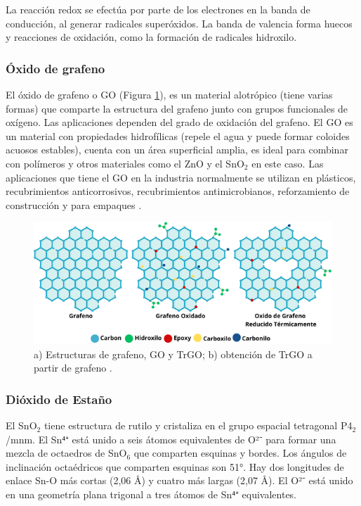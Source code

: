 \documentclass[12pt]{article}
\begin{document}
    La reacción redox se efectúa por parte de los electrones en la banda de conducción, al generar radicales superóxidos. La banda de valencia forma huecos y reacciones de oxidación, como la formación de radicales hidroxilo.\vspace{1em} %
    
    \subsubsection{Óxido de grafeno}
    El óxido de grafeno o GO (Figura \ref{fig:Grafeno_dibujo}), es un material alotrópico (tiene varias formas) que comparte la estructura del grafeno junto con grupos funcionales de oxígeno. Las aplicaciones dependen del grado de oxidación del grafeno. El GO es un material con propiedades hidrofílicas (repele el agua y puede formar coloides acuosos estables), cuenta con un área superficial amplia, es ideal para combinar con polímeros y otros materiales como el ZnO y el SnO$\displaystyle_{2}$ en este caso. Las aplicaciones que tiene el GO en la industria normalmente se utilizan en plásticos, recubrimientos anticorrosivos, recubrimientos antimicrobianos, reforzamiento de construcción y para empaques \cite{IEEEreferencias:Ref12,IEEEreferencias:GO_1}.

    \begin{figure}[H]
    	   \begin{center}
     	  	\includegraphics[width = 1\textwidth]{Imagenes/Grafeno_dibujo.png}
     	  	\caption{a) Estructuras de grafeno, GO y TrGO; b) obtención de TrGO a partir
de grafeno \cite{IEEEreferencias:GO_GOr}. }\label{fig:Grafeno_dibujo}  
    	   \end{center} 
        \end{figure}

        
    \subsubsection{Dióxido de Estaño}
    El SnO$\displaystyle _{2}$ tiene estructura de rutilo y cristaliza en el grupo espacial tetragonal P4$\displaystyle _{2}$/mnm. El Sn⁴⁺ está unido a seis átomos equivalentes de O²⁻ para formar una mezcla de octaedros de SnO$\displaystyle _{6}$ que comparten esquinas y bordes. Los ángulos de inclinación octaédricos que comparten esquinas son 51°. Hay dos longitudes de enlace Sn-O más cortas (2,06 Å) y cuatro más largas (2,07 Å). El O²⁻ está unido en una geometría plana trigonal a tres átomos de Sn⁴⁺ equivalentes.\vspace{1em} %
    
\end{document}
